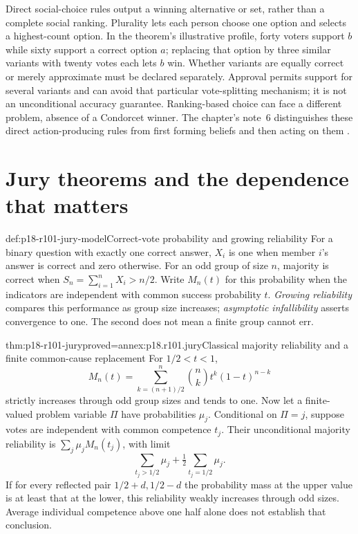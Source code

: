 Direct social-choice rules output a winning alternative or set, rather
than a complete social ranking. Plurality lets each person choose one
option and selects a highest-count option. In the theorem's illustrative
profile, forty voters support \(b\) while sixty support a correct
option \(a\); replacing that option by three similar variants with
twenty votes each lets \(b\) win. Whether variants are equally correct
or merely approximate must be declared separately. Approval permits
support for several variants and can avoid that particular vote-splitting
mechanism; it is not an unconditional accuracy guarantee. Ranking-based
choice can face a different problem, absence of a Condorcet winner.
The chapter's note~6 distinguishes these direct action-producing rules
from first forming beliefs and then acting on them
\parencite[p.~583 and n.~6, p.~587]{DietrichSpiekermann2021Social}.

\section{Jury theorems and the dependence that matters}
\label{sec:p18-r101-juries}

\begin{hbdefinition}{def:p18-r101-jury-model}{Correct-vote probability and growing reliability}
For a binary question with exactly one correct answer, \(X_i\) is one
when member \(i\)'s answer is correct and zero otherwise. For an odd
group of size \(n\), majority is correct when
\(S_n=\sum_{i=1}^{n}X_i>n/2\). Write \(M_n(t)\) for this probability
when the indicators are independent with common success probability
\(t\). \emph{Growing reliability} compares this performance as group
size increases; \emph{asymptotic infallibility} asserts convergence to
one. The second does not mean a finite group cannot err.
\end{hbdefinition}

\begin{hbtheorem}{thm:p18-r101-jury}{proved=annex:p18.r101.jury}{Classical majority reliability and a finite common-cause replacement}
For \(1/2<t<1\),
\[
 M_n(t)=\sum_{k=(n+1)/2}^{n}{n\choose k}t^k(1-t)^{n-k}
\]
strictly increases through odd group sizes and tends to one.
Now let a finite-valued problem variable \(\Pi\) have probabilities
\(\mu_j\). Conditional on \(\Pi=j\), suppose votes are independent
with common competence \(t_j\). Their unconditional majority reliability
is \(\sum_j\mu_jM_n(t_j)\), with limit
\[
 \sum_{t_j>1/2}\mu_j+\tfrac12\sum_{t_j=1/2}\mu_j.
\]
If for every reflected pair \(1/2+d,1/2-d\) the probability mass at
the upper value is at least that at the lower, this reliability weakly
increases through odd sizes. Average individual competence above one
half alone does not establish that conclusion.
\end{hbtheorem}

